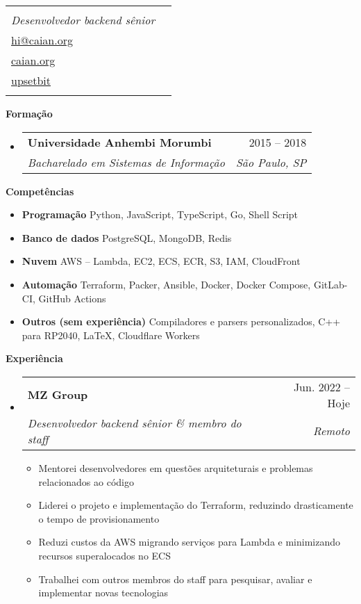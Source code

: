 \documentclass[letterpaper,12pt]{article}[leftmargin=*]
\makeatletter
\def \fullname {Caian Ertl}
\def \subtitle {Desenvolvedor backend sênior}
\def \emailicon {\faEnvelope}
\def \emaillink {mailto:hi@caian.org}
\def \emailtext {hi@caian.org}
\def \phoneicon {\faPhone}
\def \phonetext {+1 (212) 555-4240}
\def \githubicon {\faGithub}
\def \githublink {https://github.com/upsetbit}
\def \githubtext {upsetbit}
\def \websiteicon {\faGlobe}
\def \websitelink {https://caian.org}
\def \websitetext {caian.org}
\def \headertype {\singlecol} %
\def \entryspacing {-0pt}
\def \phone {\phoneicon \hspace{3pt}{ \phonetext}}
\def \email {\emailicon \hspace{3pt}\href{\emaillink}{\emailtext}}
\def \github {\githubicon \hspace{3pt}\href{\githublink}{\githubtext}}
\def \website {\websiteicon \hspace{3pt}\href{\websitelink}{\websitetext}}
\renewcommand{\section}[2]{\vspace{5pt}
  \colorbox{secondary}{\color{white}\raggedbottom\normalsize\textbf{{#1}{\hspace{7pt}#2}}}
}
\newcommand{\resumeEntryStart}{\begin{itemize}[leftmargin=2.5mm]}
\newcommand{\resumeEntryEnd}{\end{itemize}\vspace{\entryspacing}}
\newcommand{\resumeItemListStart}{\begin{itemize}[leftmargin=4.5mm]}
\newcommand{\resumeItemListEnd}{\end{itemize}}
\newcommand{\resumeItem}[1]{
  \item\small{
    {#1 \vspace{-2pt}}
  }
}
\newcommand{\resumeEntryTSDL}[4]{
  \vspace{-1pt}\item[]
    \begin{tabularx}{0.97\textwidth}{X@{\hspace{60pt}}r}
      \textbf{\color{primary}#1} & {\firabook\color{accent}\small#2} \\
      \textit{\color{accent}\small#3} & \textit{\color{accent}\small#4} \\
    \end{tabularx}\vspace{-6pt}
}
\newcommand{\resumeEntryS}[2]{
  \item[]\small{
    \textbf{\color{primary}#1 }{ #2 \vspace{-6pt}}
  }
}
\newcommand{\doublecol}[5]{
  \begin{tabularx}{\textwidth}{Xr}
    {
      \begin{tabular}[c]{l}
        \fontsize{35}{45}\selectfont{\color{primary}{{\textbf{\fullname}}}} \\
        {\textit{\subtitle}} %
      \end{tabular}
    } & {
      \begin{tabular}[c]{l@{\hspace{1.5em}}l}
        {\small#3} & {\small#1} \\
        {\small#4} & {\small#2} \\
        {\small#5}
      \end{tabular}
    }
  \end{tabularx}
}
\newcommand{\singlecol}[5]{
  \begin{tabularx}{\textwidth}{Xr}
    {
      \begin{tabular}[b]{l}
        \fontsize{35}{45}\selectfont{\color{primary}{{\textbf{\fullname}}}} \\
        {\textit{\subtitle}} %
      \end{tabular}
    } & {
      \begin{tabular}[c]{l}
        {\small#1} \\
        {\small#2} \\
        {\small#3} \\
        {\small#4} \\
        {\small#5}
      \end{tabular}
    }
  \end{tabularx}
}
\makeatother
\begin{document}


\headertype{\phone}{\email}{\website}{\github}{} %
\vspace{-10pt} %

\section{\faGraduationCap}{Formação }

  \resumeEntryStart
    \resumeEntryTSDL
      {Universidade Anhembi Morumbi}{2015 -- 2018}
      {Bacharelado em Sistemas de Informação}{São Paulo, SP}
  \resumeEntryEnd

\section{\faGears}{Competências }
 \resumeEntryStart
  \resumeEntryS{Programação } {Python, JavaScript, TypeScript, Go, Shell Script}
  \resumeEntryS{Banco de dados } {PostgreSQL, MongoDB, Redis}
  \resumeEntryS{Nuvem } {AWS -- Lambda, EC2, ECS, ECR, S3, IAM, CloudFront}
  \resumeEntryS{Automação } {Terraform, Packer, Ansible, Docker, Docker Compose, GitLab-CI, GitHub Actions}
  \resumeEntryS{Outros (sem experiência) } {Compiladores e parsers personalizados, C++ para RP2040, \LaTeX, Cloudflare Workers}
 \resumeEntryEnd

\section{\faPieChart}{Experiência }

  \resumeEntryStart
    \resumeEntryTSDL
      {MZ Group}{Jun. 2022 -- Hoje}
      {Desenvolvedor backend sênior \& membro do staff}{Remoto}
    \resumeItemListStart
      \resumeItem {Mentorei desenvolvedores em questões arquiteturais e problemas relacionados ao código}
      \resumeItem {Liderei o projeto e implementação do Terraform, reduzindo drasticamente o tempo de provisionamento}
      \resumeItem {Reduzi custos da AWS migrando serviços para Lambda e minimizando recursos superalocados no ECS}
      \resumeItem {Trabalhei com outros membros do staff para pesquisar, avaliar e implementar novas tecnologias}
    \resumeItemListEnd
  \resumeEntryEnd
\end{document}
